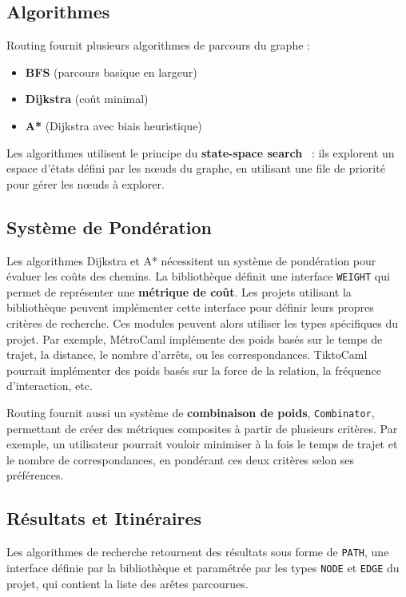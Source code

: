 \documentclass[12pt,a4paper]{article}
\begin{document}
\subsection{Algorithmes}

Routing fournit plusieurs algorithmes de parcours du graphe :
\begin{itemize}
    \item \textbf{BFS} (parcours basique en largeur)
    \item \textbf{Dijkstra} (coût minimal)~\cite{dijkstra}
    \item \textbf{A*} (Dijkstra avec biais heuristique)~\cite{astar}
\end{itemize}

Les algorithmes utilisent le principe du \textbf{state-space search}~\cite{abbeel} : ils explorent un espace d'états défini par les n\oe{}uds du graphe, en utilisant une file de priorité pour gérer les n\oe{}uds à explorer.

\subsection{Système de Pondération}

Les algorithmes Dijkstra et A* nécessitent un système de pondération pour évaluer les coûts des chemins. La bibliothèque définit une interface \texttt{WEIGHT} qui permet de représenter une \textbf{métrique de coût}. Les projets utilisant la bibliothèque peuvent implémenter cette interface pour définir leurs propres critères de recherche. Ces modules peuvent alors utiliser les types spécifiques du projet. Par exemple, MétroCaml implémente des poids basés sur le temps de trajet, la distance, le nombre d'arrêts, ou les correspondances. TiktoCaml pourrait implémenter des poids basés sur la force de la relation, la fréquence d'interaction, etc.

Routing fournit aussi un système de \textbf{combinaison de poids}, \texttt{Combinator}, permettant de créer des métriques composites à partir de plusieurs critères. Par exemple, un utilisateur pourrait vouloir minimiser à la fois le temps de trajet et le nombre de correspondances, en pondérant ces deux critères selon ses préférences.

\subsection{Résultats et Itinéraires}

Les algorithmes de recherche retournent des résultats sous forme de \texttt{PATH}, une interface définie par la bibliothèque et paramétrée par les types \texttt{NODE} et \texttt{EDGE} du projet, qui contient la liste des arêtes parcourues.
\end{document}
